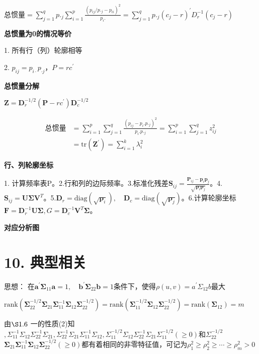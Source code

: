 \documentclass[10pt,a4paper]{ctexart} %
\begin{document}
\begin{multicols*}{3}
		$\text{总惯量}=\sum_{j=1}^qp._j\sum_{i=1}^p\frac{(p_{ij}/p._j-p_{ii})^2}{p_i.}=\sum_{j=1}^qp._j(c_j-r)^{\prime}D_r^{-1}(c_j-r)$
		
		\textbf{总惯量为0的情况等价}
		
		1. 所有行（列）轮廓相等
		
		2. $p_{ij}=p_{i·}p_{·j}$，$P=rc^{'}$
		
		\textbf{总惯量分解}
		
		$\mathbf{Z}=\mathbf{D}_r^{-1/2}(\mathbf{P}-rc^{\prime})\mathbf{D}_c^{-1/2}$
		
		$$\begin{aligned}\text{总惯量}&=\sum_{i=1}^p\sum_{j=1}^q\frac{(p_{ij}-p_i.p._j)^2}{p_i.p._j}=\sum_{i=1}^p\sum_{j=1}^qz_{ij}^2\\&=\mathrm{tr}(\mathbf{Z}^{\prime})=\sum_{i=1}^{k}\lambda_{i}^{2}\end{aligned}$$
		
		\textbf{行、列轮廓坐标}
		
		1. 计算频率表P。2.行和列的边际频率。3.标准化残差$\mathbf{S}_{ij}=\frac{\mathbf{P}_{ij}-\mathbf{p}_i\mathbf{p}_j}{\sqrt{\mathbf{p}_i\mathbf{p}_j}}$。4.$\mathbf{S}_{ij}=\mathbf{U}\mathbf{\Sigma}\mathbf{V}^T$。5.$\mathbf{D}_r=\mathrm{diag}(\sqrt{\mathbf{p}_i}),\quad\mathbf{D}_c=\mathrm{diag}(\sqrt{\mathbf{p}_j})$。6.计算轮廓坐标$\mathbf{F}=\mathbf{D}_{r}^{-1}\mathbf{U}\mathbf{\Sigma}\mathbf,{G}=\mathbf{D}_{c}^{-1}\mathbf{V}^{T}\mathbf{\Sigma}$。
		
		\textbf{对应分析图}
		
		\section*{\centering \normalsize 10. 典型相关}
		
		思想：
		在$\boldsymbol{a}^{\prime} \boldsymbol{\Sigma}_{11} \boldsymbol{a}=1, \quad \boldsymbol{b}^{\prime} \boldsymbol{\Sigma}_{22} \boldsymbol{b}=1$条件下，使得$\rho(u,v)=a^{'}\Sigma_{12}b$最大
		
		$\mathrm{rank}(\boldsymbol{\Sigma}_{22}^{-1/2}\boldsymbol{\Sigma}_{21}\boldsymbol{\Sigma}_{11}^{-1}\boldsymbol{\Sigma}_{12}\boldsymbol{\Sigma}_{22}^{-1/2})=\mathrm{rank}(\boldsymbol{\Sigma}_{11}^{-1/2}\boldsymbol{\Sigma}_{12}\boldsymbol{\Sigma}_{22}^{-1/2})=\mathrm{rank}(\boldsymbol{\Sigma}_{12})=m$
		
		由$\S1.6$ 一的性质(2)知 $,\Sigma_{11}^{-1}\Sigma_{12}\Sigma_{22}^{-1}\Sigma_{21},\Sigma_{22}^{-1}\Sigma_{21}\Sigma_{11}^{-1}\Sigma_{12},\Sigma_{11}^{-1/2}\Sigma_{12}\Sigma_{22}^{-1}\Sigma_{21}\Sigma_{11}^{-1/2}(\geqslant0)$和$\Sigma_{22}^{-1/2}$ $\boldsymbol{\Sigma}_{21}\boldsymbol{\Sigma}_{11}^{-1}\boldsymbol{\Sigma}_{12}\boldsymbol{\Sigma}_{22}^{-1/2}(\boldsymbol{\geqslant}0)$都有着相同的非零特征值，可记为$\rho_1^2\geq\rho_2^2\geqslant\cdots\geqslant\rho_m^2>0$
		

\end{multicols*}
\end{document}
